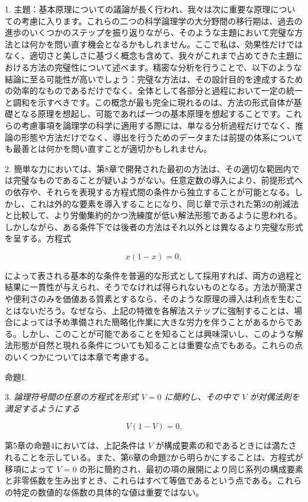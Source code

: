 \documentclass[a4paper,11pt,openany]{ltjsbook}
\begin{document}
1. 主題：基本原理についての議論が長く行われ、我々は次に重要な原理についての考慮に入ります。これらの二つの科学論理学の大分野間の移行期は、過去の進歩のいくつかのステップを振り返りながら、そのような主題において完璧な方法とは何かを問い直す機会となるかもしれません。ここで私は、効果性だけではなく、適切さと美しさに基づく概念も含めて、我々がこれまで占めてきた主題における方法の完璧性について述べます。精密な分析を行うことで、以下のような結論に至る可能性が高いでしょう：完璧な方法は、その設計目的を達成するための効率的なものであるだけでなく、全体として各部分と過程において一定の統一と調和を示すべきです。この概念が最も完全に現れるのは、方法の形式自体が基礎となる原理を想起し、可能であれば一つの基本原理を想起することです。これらの考慮事項を論理学の科学に適用する際には、単なる分析過程だけでなく、推論の形態や方法だけでなく、導出を行うためのデータまたは前提の体系についても最善とは何かを問い直すことが適切かもしれません。

2. 簡単な力においては、第8章で開発された最初の方法は、その適切な範囲内では完璧なものであることが疑いようがない。任意定数の導入により、前提形式への依存や、それらを表現する方程式間の条件から独立することが可能となる。しかし、これは外的な要素を導入することになり、同じ章で示された第2の削減法と比較して、より労働集約的かつ洗練度が低い解法形態であるように思われる。しかしながら、ある条件下では後者の方法はそれ以外とは異なるより完璧な形式を呈する。方程式

\[
x(1-x) = 0,
\]

によって表される基本的な条件を普遍的な形式として採用すれば、両方の過程と結果に一貫性が与えられ、そうでなければ得られないものとなる。方法が簡潔さや便利さのみを価値ある質素とするなら、そのような原理の導入は利点を生むことはないだろう。なぜなら、上記の特徴を各解法ステップに強制することは、場合によっては予め準備された簡略化作業に大きな労力を伴うことがあるからである。しかし、このことが可能であることを知ることは興味深いし、このような解法形態が自然と現れる条件についても知ることは重要な点でもある。これらの点のいくつかについては本章で考慮する。

\begin{center}
\textsc{命題I.}
\end{center}

3. \textit{論理符号間の任意の方程式を形式 $V=0$ に簡約し、その中で $V$ が対偶法則を満足するようにする}

\[
V(1 - V) = 0.
\]

第5章の命題4においては、上記条件は $V$ が構成要素の和であるときには満たされることを示している。また、第6章の命題2から明らかにすることは、方程式が移項によって $V=0$ の形に簡約され、最初の項の展開により同じ系列の構成要素と非零係数を生み出すとき、これらはすべて等価であるという点である。これらの特定の数値的な係数の具体的な値は重要ではない。
\end{document}

